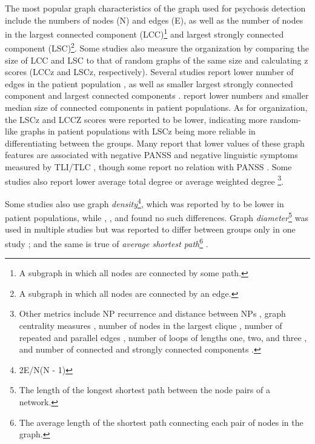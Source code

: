 The most popular graph characteristics of the graph used for psychosis detection include the numbers of nodes (N) and edges (E), as well as the number of nodes in the largest connected component (LCC)\footnote{A subgraph in which all nodes are connected by some path.} and largest strongly connected component (LSC)\footnote{A subgraph in which all nodes are connected by an edge.}. Some studies also measure the organization by comparing the size of LCC and LSC to that of random graphs of the same size and calculating z scores (LCCz and LSCz, respectively). Several studies report lower number of edges in the patient population \citep{mota2014graph, mota2016quantifying, mota2017thought, nikzad2022does}, as well as smaller largest strongly connected component and largest connected components \citep{mota2014graph, mota2016quantifying, mota2017thought, spencer2021lower, morgan2021natural, nikzad2022does}. \citet{nettekoven2023semantic} report lower numbers and smaller median size of connected components in patient populations. As for organization, the LSCz and LCCZ scores were reported to be lower, indicating more random-like graphs in patient populations \citep{mota2016quantifying, mota2017thought, spencer2021lower, morgan2021natural, nikzad2022does} with LSCz being more reliable in differentiating between the groups. Many report that lower values of these graph features are associated with negative PANSS \citep{mota2014graph, mota2016quantifying, nikzad2022does} and negative linguistic symptoms measured by TLI/TLC \citep{morgan2021natural, spencer2021lower, nikzad2022does}, though some report no relation with PANSS \citep{mota2012speech, argolo2023burnishing, nettekoven2023semantic}. Some studies also report lower average total degree \citep{mota2014graph} or average weighted degree \citep{nikzad2022does}\footnote{Other metrics include NP recurrence and distance between NPs \citep{palominos2023coreference}, graph centrality measures \citep{argolo2023burnishing}, number of nodes in the largest clique \citep{tang2022clinical, tang2023latent}, number of repeated and parallel edges \citep{mota2012speech, mota2014graph}, number of loops of lengths one, two, and three \citep{mota2012speech, mota2014graph}, and number of connected and strongly connected components \citep{argolo2023burnishing, nettekoven2023semantic}.}.

Some studies also use graph \textit{density}\footnote{2E/N(N - 1)}, which was reported by \citet{nikzad2022does} to be lower in patient populations, while \citet{mota2012speech}, \citet{mota2014graph}, and \citep{argolo2023burnishing} found no such differences. Graph \textit{diameter}\footnote{The length of the longest shortest path between the node pairs of a network.} was used in multiple studies but was reported to differ between groups only in one study \citep{mota2014graph}; and the same is true of \textit{average shortest path}\footnote{The average length of the shortest path connecting each pair of nodes in the graph.} \citep{mota2012speech, nikzad2022does, tang2022clinical, argolo2023burnishing}. 

